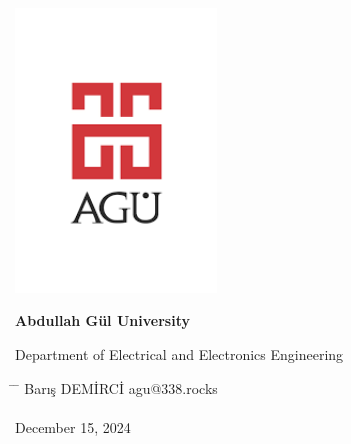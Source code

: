 \begin{center}
	\includegraphics[width=0.4\textwidth]{assets/agu.png}

	\Huge
	\textbf{Abdullah Gül University}
	
	\vspace{0.3cm}
	Department of Electrical and Electronics Engineering

	\vspace{1cm}
	\Huge
	\textbf{\paperTitle}

	\vspace{0.3cm}
	\Huge
	\paperSubTitle{}

	\vspace{0.8cm}
	\large
	\vspace{0.5cm}
	\LARGE
	\vspace{1.5cm}
	\textbf{}
	\vfill
	\vspace{0.8cm}
	\Large
\end{center}

\begin{tabbing}
	\hspace*{1em}\= \hspace*{8em} \= \kill
	\> Barış DEMİRCİ \> agu@338.rocks \\
	\> \> \\
	\> December 15, 2024 \> \\
\end{tabbing}
